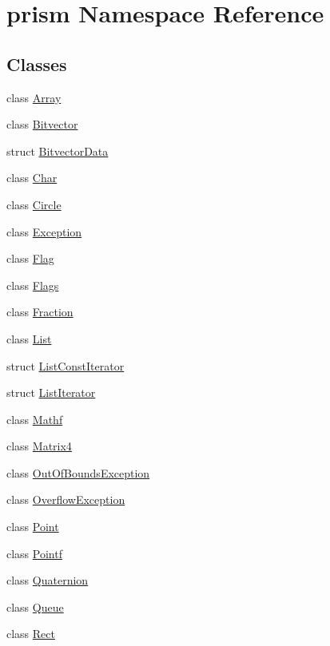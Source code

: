 \hypertarget{namespaceprism}{}\section{prism Namespace Reference}
\label{namespaceprism}
\subsection*{Classes}
\begin{DoxyCompactItemize}
\item 
class \hyperlink{classprism_1_1_array}{Array}
\item 
class \hyperlink{classprism_1_1_bitvector}{Bitvector}
\item 
struct \hyperlink{structprism_1_1_bitvector_data}{Bitvector\+Data}
\item 
class \hyperlink{classprism_1_1_char}{Char}
\item 
class \hyperlink{classprism_1_1_circle}{Circle}
\item 
class \hyperlink{classprism_1_1_exception}{Exception}
\item 
class \hyperlink{classprism_1_1_flag}{Flag}
\item 
class \hyperlink{classprism_1_1_flags}{Flags}
\item 
class \hyperlink{classprism_1_1_fraction}{Fraction}
\item 
class \hyperlink{classprism_1_1_list}{List}
\item 
struct \hyperlink{structprism_1_1_list_const_iterator}{List\+Const\+Iterator}
\item 
struct \hyperlink{structprism_1_1_list_iterator}{List\+Iterator}
\item 
class \hyperlink{classprism_1_1_mathf}{Mathf}
\item 
class \hyperlink{classprism_1_1_matrix4}{Matrix4}
\item 
class \hyperlink{classprism_1_1_out_of_bounds_exception}{Out\+Of\+Bounds\+Exception}
\item 
class \hyperlink{classprism_1_1_overflow_exception}{Overflow\+Exception}
\item 
class \hyperlink{classprism_1_1_point}{Point}
\item 
class \hyperlink{classprism_1_1_pointf}{Pointf}
\item 
class \hyperlink{classprism_1_1_quaternion}{Quaternion}
\item 
class \hyperlink{classprism_1_1_queue}{Queue}
\item 
class \hyperlink{classprism_1_1_rect}{Rect}

\end{DoxyCompactItemize}

